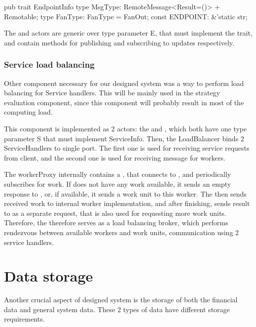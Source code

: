 \begin{code}[language=rust,label={endpointinfo_trait},caption={EndpointInfo trait definition}]
pub trait EndpointInfo {
    type MsgType: RemoteMessage<Result=()> + Remotable;
    type FanType: FanType = FanOut;
    const ENDPOINT: &'static str;
}
\end{code}

The  and  actors are generic over type parameter E, that must implement the 
trait, and contain methods for publishing and subscribing to updates respectively.

\subsubsection{Service load balancing}
Other component necessary for our designed system was a way to perform load balancing for Service handlers.
This will be mainly used in the strategy evaluation component, since this component will probably result in most
of the computing load.

This component is implemented as 2 actors: the  and , which both have one type
parameter S that must implement ServiceInfo. Then, the LoadBalancer binds 2 ServiceHandlers to single port.
The first one is used for receiving service requests from client, and the second one is used for receiving message for workers.

The workerProxy internally contains a , that connects to , and periodically subscribes
for work. If  does not have any work available, it sends an empty response to ,
or, if available, it sends a work unit to this worker. The  then sends received work to internal
worker implementation, and after finishing, sends result to  as a separate request, that is also used
for requesting more work units.
Therefore, the  therefore serves as a load balancing broker, which performs rendezvous between available workers
and work units, communication using 2 service handlers.

\section{Data storage}
Another crucial aspect of designed system is the storage of both the financial data and general system data.
These 2 types of data have different storage requirements.


